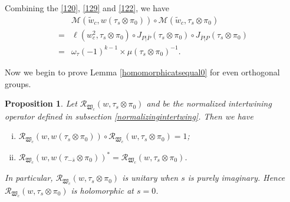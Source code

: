 \documentclass[article]{article}
\numberwithin{equation}{section}
\newtheorem{proposition}[theorem]{Proposition}
\theoremstyle{definition}
\begin{document}
Combining the \ref{120}, \ref{129} and \ref{122}, we have 
\begin{equation}\label{1235}
\begin{aligned}
&\mathcal M(\widetilde{w}_{c},w(\tau_{s}\otimes \pi_0))\circ \mathcal M(\widetilde{w}_{c},\tau_{s}\otimes \pi_0)\\
=& \ell(w^2_c,\tau_s\otimes \pi_0)\circ J_{P|\overline P}(\tau_{s}\otimes \pi_0)\circ J_{\overline P|P}(\tau_{s}\otimes \pi_0)\\
=& \omega_{\tau}(-1)^{k-1}\times \mu(\tau_{s}\otimes\pi_0)^{-1}.
\end{aligned}
\end{equation}

Now we begin to prove Lemma \ref{homomorphicatsequal0} for even orthogonal groups. 
\begin{proposition}\label{appendixa1}
Let $\mathcal R_{\mathfrak W_c}\left(w, \tau_{s} \otimes \pi_0\right)$ and be the normalized intertwining operator defined in subsection \ref{normalizingintertwing}. Then we have  
\begin{enumerate}[(i)]
	\item $	\mathcal R_{\mathfrak W_c}\left(w, w(\tau_{s} \otimes \pi_0)\right)\circ \mathcal R_{\mathfrak W_c}\left(w, \tau_{s} \otimes \pi_0\right)=1 $;
	\item $\mathcal R_{\mathfrak W_c}\left(w, w(\tau_{-\bar s} \otimes \pi_0)\right)^*=\mathcal R_{\mathfrak W_c}\left(w,\tau_{s} \otimes \pi_0 \right)$. 
\end{enumerate}
In particular, $\mathcal R_{\mathfrak W_c}\left(w,\tau_{s} \otimes \pi_0 \right)$ is unitary when $s$ is purely imaginary. Hence $\mathcal R_{\mathfrak W_c}\left(w,\tau_{s} \otimes \pi_0 \right)$ is holomorphic at $s=0$. 
\end{proposition}
\end{document}
